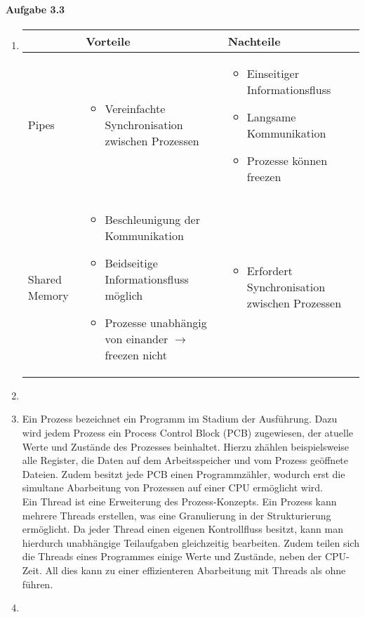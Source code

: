 \documentclass[11pt]{article}
\begin{document}
\paragraph{Aufgabe 3.3}
\begin{enumerate}[label=\alph*)]
\item
\begin{tabular}{ |p{3cm}||p{5cm}|p{5cm}| }
\hline
& Vorteile & Nachteile \\
\hline
\hline
Pipes &
\begin{itemize}
\item Vereinfachte Synchronisation zwischen Prozessen
\end{itemize} & \begin{itemize}
\item Einseitiger Informationsfluss
\item Langsame Kommunikation
\item Prozesse können freezen
\end{itemize}\\
\hline
Shared Memory & \begin{itemize}
\item Beschleunigung der Kommunikation
\item Beidseitige Informationsfluss möglich
\item Prozesse unabhängig von einander $\rightarrow$ freezen nicht
\end{itemize} & \begin{itemize}
\item Erfordert Synchronisation zwischen Prozessen
\end{itemize}\\
\hline
\end{tabular}

\item

\item Ein Prozess bezeichnet ein Programm im Stadium der Ausführung. Dazu wird jedem Prozess ein Process Control Block (PCB) zugewiesen, der atuelle Werte und Zustände des Prozesses beinhaltet. Hierzu zhählen beispielsweise alle Register, die Daten auf dem Arbeitsspeicher und vom Prozess geöffnete Dateien. Zudem besitzt jede PCB einen Programmzähler, wodurch erst die simultane Abarbeitung von Prozessen auf einer CPU ermöglicht wird.\\
Ein Thread ist eine Erweiterung des Prozess-Konzepts. Ein Prozess kann mehrere Threads erstellen, was eine Granulierung in der Strukturierung ermöglicht. Da jeder Thread einen eigenen Kontrollfluss besitzt, kann man hierdurch unabhängige Teilaufgaben gleichzeitig bearbeiten. Zudem teilen sich die Threads eines Programmes einige Werte und Zustände, neben der CPU-Zeit. All dies kann zu einer effizienteren Abarbeitung mit Threads als ohne führen.

\item
\end{enumerate}
\end{document}
